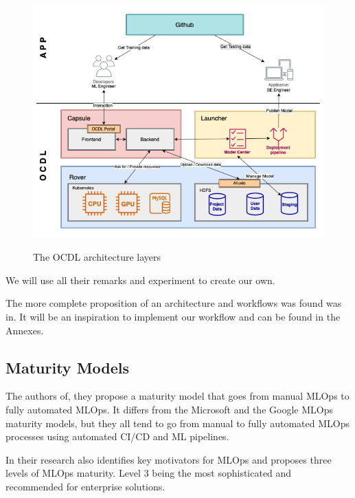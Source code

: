 \begin{figure}[!htbp]
    \caption{The OCDL architecture layers\cite{LIU2020704}}
    \centering
    \includegraphics[scale=0.5]{images/ocdl-architecture}
    \label{fig:ocdl}
\end{figure}

We will use all their remarks and experiment to create our own.

The more complete proposition of an architecture and workflows was found was in\cite{Kreuzberger2022MachineLO}.
It will be an inspiration to implement our workflow and can be found in the Annexes.

\subsection{Maturity Models}\label{subsec:matutiry-models}
The authors of\cite{mlops-maturity-model}, they propose a maturity model that goes from manual MLOps to fully automated MLOps.
It differs from the Microsoft and the Google MLOps maturity models,
but they all tend to go from manual to fully automated MLOps processes using automated CI/CD and
ML pipelines.\cite{mlops-definition-tools-and-challenge}

In their research\cite{inproceedings} also identifies key motivators for MLOps and proposes three levels of MLOps maturity.
Level 3 being the most sophisticated and recommended for enterprise solutions.

